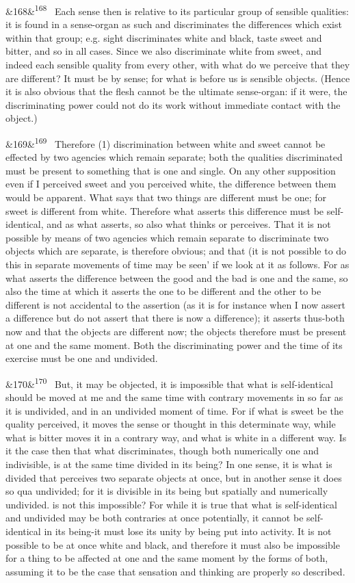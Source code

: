 \documentclass[12pt]{article}
\newcommand{\para}[1][]{\par\noindent\ifx&#1&\else\textsuperscript{\footnotesize #1}~\fi}
\begin{document}
\para[168] Each sense then is relative to its particular group of sensible qualities: it is found in a sense-organ as such and discriminates the differences which exist within that group; e.g. sight discriminates white and black, taste sweet and bitter, and so in all cases. Since we also discriminate white from sweet, and indeed each sensible quality from every other, with what do we perceive that they are different? It must be by sense; for what is before us is sensible objects. (Hence it is also obvious that the flesh cannot be the ultimate sense-organ: if it were, the discriminating power could not do its work without immediate contact with the object.)

\para[169] Therefore (1) discrimination between white and sweet cannot be effected by two agencies which remain separate; both the qualities discriminated must be present to something that is one and single. On any other supposition even if I perceived sweet and you perceived white, the difference between them would be apparent. What says that two things are different must be one; for sweet is different from white. Therefore what asserts this difference must be self-identical, and as what asserts, so also what thinks or perceives. That it is not possible by means of two agencies which remain separate to discriminate two objects which are separate, is therefore obvious; and that (it is not possible to do this in separate movements of time may be seen' if we look at it as follows. For as what asserts the difference between the good and the bad is one and the same, so also the time at which it asserts the one to be different and the other to be different is not accidental to the assertion (as it is for instance when I now assert a difference but do not assert that there is now a difference); it asserts thus-both now and that the objects are different now; the objects therefore must be present at one and the same moment. Both the discriminating power and the time of its exercise must be one and undivided.

\para[170] But, it may be objected, it is impossible that what is self-identical should be moved at me and the same time with contrary movements in so far as it is undivided, and in an undivided moment of time. For if what is sweet be the quality perceived, it moves the sense or thought in this determinate way, while what is bitter moves it in a contrary way, and what is white in a different way. Is it the case then that what discriminates, though both numerically one and indivisible, is at the same time divided in its being? In one sense, it is what is divided that perceives two separate objects at once, but in another sense it does so qua undivided; for it is divisible in its being but spatially and numerically undivided. is not this impossible? For while it is true that what is self-identical and undivided may be both contraries at once potentially, it cannot be self-identical in its being-it must lose its unity by being put into activity. It is not possible to be at once white and black, and therefore it must also be impossible for a thing to be affected at one and the same moment by the forms of both, assuming it to be the case that sensation and thinking are properly so described.
\end{document}

